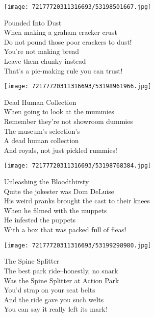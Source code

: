 \documentclass[10pt,letterpaper]{article}
\begin{document}
\begin{center}\texttt{[image: 72177720311316693/53198501667.jpg]}
\end{center}
\begin{center}
Pounded Into Dust\\
\vskip 0.2in
When making a graham cracker crust\\
Do not pound those poor crackers to dust!\\
You're not making bread\\
Leave them chunky instead\\
That's a pie-making rule you can trust!\\
\end{center}
\pagebreak

\begin{center}
\texttt{[image: 72177720311316693/53198961966.jpg]}
\end{center}

\begin{center}
Dead Human Collection\\
\vskip 0.2in
When going to look at the mummies\\
Remember they're not showroom dummies\\
The museum's selection's\\
A dead human collection\\
And royals, not just pickled rummies!\\
\end{center}
\pagebreak

\begin{center}\texttt{[image: 72177720311316693/53198768384.jpg]}
\end{center}
\begin{center}
Unleashing the Bloodthirsty\\
\vskip 0.2in
Quite the jokester was Dom DeLuise\\
His weird pranks brought the cast to their knees\\
When he filmed with the muppets\\
He infested the puppets\\
With a box that was packed full of fleas!\\
\end{center}
\pagebreak

\begin{center}\texttt{[image: 72177720311316693/53199298980.jpg]}
\end{center}
\begin{center}
The Spine Splitter\\
\vskip 0.2in
The best park ride--honestly, no snark\\
Was the Spine Splitter at Action Park\\
You'd strap on your seat belts\\
And the ride gave you such welts\\
You can say it really left its mark!\\
\end{center}
\pagebreak
\end{document}
